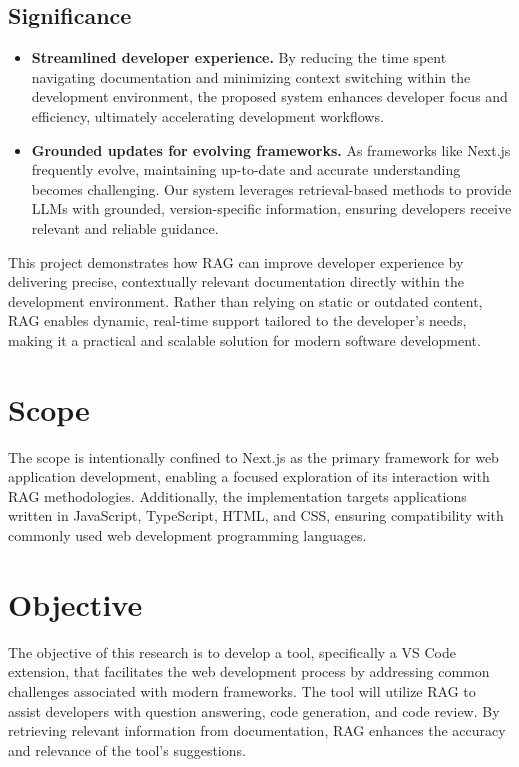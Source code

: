 \subsection*{Significance}

\begin{itemize}
	\item \textbf{Streamlined developer experience.} By reducing the time spent navigating documentation and minimizing context switching within the development environment, the proposed system enhances developer focus and efficiency, ultimately accelerating development workflows.
	\item \textbf{Grounded updates for evolving frameworks.} As frameworks like Next.js frequently evolve, maintaining up-to-date and accurate understanding becomes challenging. Our system leverages retrieval-based methods to provide LLMs with grounded, version-specific information, ensuring developers receive relevant and reliable guidance.
\end{itemize}

This project demonstrates how RAG can improve developer experience by delivering precise, contextually relevant documentation directly within the development environment. Rather than relying on static or outdated content, RAG enables dynamic, real-time support tailored to the developer's needs, making it a practical and scalable solution for modern software development.

\section{Scope}
The scope is intentionally confined to Next.js as the primary framework for web application development, enabling a focused exploration of its interaction with RAG methodologies. Additionally, the implementation targets applications written in JavaScript, TypeScript, HTML, and CSS, ensuring compatibility with commonly used web development programming languages.

\section{Objective} \label{objectives}

The objective of this research is to develop a tool, specifically a VS Code extension, that facilitates the web development process by addressing common challenges associated with modern frameworks. The tool will utilize RAG to assist developers with question answering, code generation, and code review. By retrieving relevant information from documentation, RAG enhances the accuracy and relevance of the tool's suggestions.

